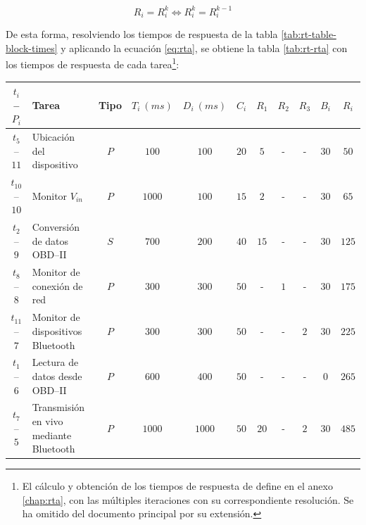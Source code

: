 \begin{equation*}
  R_i = R_i^k \Longleftrightarrow R_i^k = R_i^{k - 1}
\end{equation*}

De esta forma, resolviendo los tiempos de respuesta de la tabla \ref{tab:rt-table-block-times}
y aplicando la ecuación \ref{eq:rta}, se obtiene la tabla \ref{tab:rt-rta} con los
tiempos de respuesta de cada tarea\footnote{El cálculo y obtención de los tiempos
de respuesta de define en el anexo \ref{chap:rta}, con las múltiples iteraciones
con su correspondiente resolución. Se ha omitido del documento principal por su
extensión.}:

\begin{table}[H]
  \centering
  \begin{tabularx}{\linewidth}{c|X|c|c|c|c|c|c|c|c|c}
    $t_i$ -- $P_i$   & \textbf{Tarea}                         & \textbf{Tipo} & $T_i~\left(ms\right)$ & $D_i~\left(ms\right)$ & $C_i$ & $R_1$ & $R_2$ & $R_3$ & $B_i$ & $R_i$  \\
    \hline\hline
    $t_{5}$ -- $11$  & Ubicación del dispositivo              & $P$           & $100$                 & $100$                 & $20$  & $5$   & -     & -     & $30$  & $50$   \\
    $t_{10}$ -- $10$ & Monitor $V_{in}$                       & $P$           & $1000$                & $100$                 & $15$  & $2$   & -     & -     & $30$  & $65$   \\
    $t_{2}$ -- $9$   & Conversión de datos \ac{OBD}--II       & $S$           & $700$                 & $200$                 & $40$  & $15$  & -     & -     & $30$  & $125$  \\
    $t_{8}$ -- $8$   & Monitor de conexión de red             & $P$           & $300$                 & $300$                 & $50$  & -     & $1$   & -     & $30$  & $175$  \\
    $t_{11}$ -- $7$  & Monitor de dispositivos Bluetooth      & $P$           & $300$                 & $300$                 & $50$  & -     & -     & $2$   & $30$  & $225$  \\
    $t_{1}$ -- $6$   & Lectura de datos desde \ac{OBD}--II    & $P$           & $600$                 & $400$                 & $50$  & -     & -     & -     & $0$   & $265$  \\
    $t_{7}$ -- $5$   & Transmisión en vivo mediante Bluetooth & $P$           & $1000$                & $1000$                & $50$  & $20$  & -     & $2$   & $30$  & $485$  \\

\end{tabularx}
\end{table}
